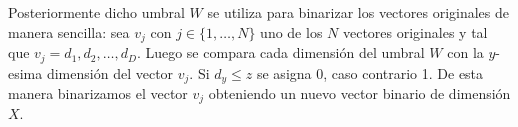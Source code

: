 		Posteriormente dicho umbral $W$ se utiliza para binarizar los vectores originales de manera sencilla: sea $v_j$ con $j \in \{1,\dots,N\}$ uno de los $N$ vectores originales y tal que $v_j = d_1,d_2,\dots,d_D$. Luego se compara cada dimensión del umbral $W$ con la $y$-esima dimensión del vector $v_j$. Si $d_y \leq z$ se asigna 0, caso contrario 1. De esta manera binarizamos el vector $v_j$ obteniendo un nuevo vector binario de dimensión $X$.
		


